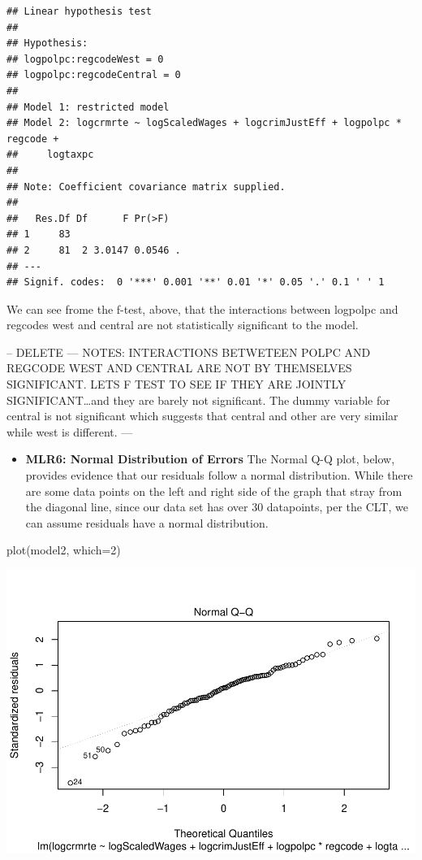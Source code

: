 \documentclass[]{article}
\newenvironment{Shaded}{}{}
\newcommand{\DataTypeTok}[1]{#1}
\newcommand{\DecValTok}[1]{#1}
\newcommand{\KeywordTok}[1]{\textcolor[rgb]{0.00,0.00,1.00}{#1}}
\newcommand{\NormalTok}[1]{#1}
\providecommand{\tightlist}{%
  \setlength{\itemsep}{0pt}\setlength{\parskip}{0pt}}
\begin{document}
\begin{verbatim}
## Linear hypothesis test
## 
## Hypothesis:
## logpolpc:regcodeWest = 0
## logpolpc:regcodeCentral = 0
## 
## Model 1: restricted model
## Model 2: logcrmrte ~ logScaledWages + logcrimJustEff + logpolpc * regcode + 
##     logtaxpc
## 
## Note: Coefficient covariance matrix supplied.
## 
##   Res.Df Df      F Pr(>F)  
## 1     83                   
## 2     81  2 3.0147 0.0546 .
## ---
## Signif. codes:  0 '***' 0.001 '**' 0.01 '*' 0.05 '.' 0.1 ' ' 1
\end{verbatim}

We can see frome the f-test, above, that the interactions between
logpolpc and regcodes west and central are not statistically significant
to the model.

-- DELETE --- NOTES: INTERACTIONS BETWETEEN POLPC AND REGCODE WEST AND
CENTRAL ARE NOT BY THEMSELVES SIGNIFICANT. LETS F TEST TO SEE IF THEY
ARE JOINTLY SIGNIFICANT\ldots{}and they are barely not significant. The
dummy variable for central is not significant which suggests that
central and other are very similar while west is different. ---

\begin{itemize}
\tightlist
\item
  \textbf{MLR6: Normal Distribution of Errors} The Normal Q-Q plot,
  below, provides evidence that our residuals follow a normal
  distribution. While there are some data points on the left and right
  side of the graph that stray from the diagonal line, since our data
  set has over 30 datapoints, per the CLT, we can assume residuals have
  a normal distribution.
\end{itemize}

\begin{Shaded}
\begin{Highlighting}[]
\KeywordTok{plot}\NormalTok{(model2, }\DataTypeTok{which=}\DecValTok{2}\NormalTok{)}
\end{Highlighting}
\end{Shaded}

\includegraphics{Bagnard_Gaustad_Hartman_Leung_Lab_3_files/figure-latex/unnamed-chunk-77-1.pdf}
\end{document}
